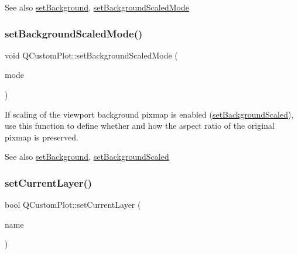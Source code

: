 \begin{DoxySeeAlso}{See also}
\mbox{\hyperlink{class_q_custom_plot_a130358592cfca353ff3cf5571b49fb00}{set\+Background}}, \mbox{\hyperlink{class_q_custom_plot_a4c0eb4865b7949f62e1cb97db04a3de0}{set\+Background\+Scaled\+Mode}} 
\end{DoxySeeAlso}
\mbox{\label{class_q_custom_plot_a4c0eb4865b7949f62e1cb97db04a3de0}} 
\subsubsection{\texorpdfstring{set\+Background\+Scaled\+Mode()}{setBackgroundScaledMode()}}
{\footnotesize\ttfamily void Q\+Custom\+Plot\+::set\+Background\+Scaled\+Mode (\begin{DoxyParamCaption}\item[{Qt\+::\+Aspect\+Ratio\+Mode}]{mode }\end{DoxyParamCaption})}

If scaling of the viewport background pixmap is enabled (\mbox{\hyperlink{class_q_custom_plot_a36f0fa1317325dc7b7efea615ee2de1f}{set\+Background\+Scaled}}), use this function to define whether and how the aspect ratio of the original pixmap is preserved.

\begin{DoxySeeAlso}{See also}
\mbox{\hyperlink{class_q_custom_plot_a130358592cfca353ff3cf5571b49fb00}{set\+Background}}, \mbox{\hyperlink{class_q_custom_plot_a36f0fa1317325dc7b7efea615ee2de1f}{set\+Background\+Scaled}} 
\end{DoxySeeAlso}
\mbox{\label{class_q_custom_plot_a73a6dc47c653bb6f8f030abca5a11852}} 
\subsubsection{\texorpdfstring{set\+Current\+Layer()}{setCurrentLayer()}\hspace{0.1cm}{\footnotesize\ttfamily [1/2]}}
{\footnotesize\ttfamily bool Q\+Custom\+Plot\+::set\+Current\+Layer (\begin{DoxyParamCaption}\item[{const Q\+String \&}]{name }\end{DoxyParamCaption})}

